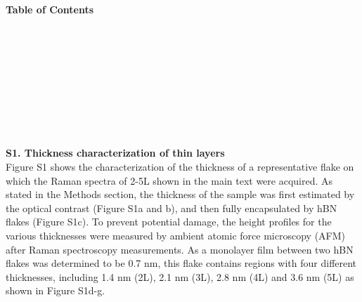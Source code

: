 \documentclass[prl, preprint, superscriptaddress]{revtex4-1}
\begin{document}
\vspace{20pt}

\noindent \textbf{Table of Contents}\\
\\
\\
\\
\\
\\
\\

\vspace{1 in}

\\
\\


\newpage

\noindent\textbf{S1. Thickness characterization of  thin layers}\\

\noindent Figure S1 shows the characterization of the thickness of a representative  flake on which the Raman spectra of 2-5L  shown in the main text were acquired. As stated in the Methods section, the thickness of the sample was first estimated by the optical contrast (Figure S1a and b), and then fully encapsulated by hBN flakes (Figure S1c). To prevent potential damage, the height profiles for the various thicknesses were measured by ambient atomic force microscopy (AFM) after Raman spectroscopy measurements. As a monolayer  film between two hBN flakes was determined to be 0.7 nm, this flake contains regions with four different thicknesses, including 1.4 nm (2L), 2.1 nm (3L), 2.8 nm (4L) and 3.6 nm (5L) as shown in Figure S1d-g.
\end{document}
